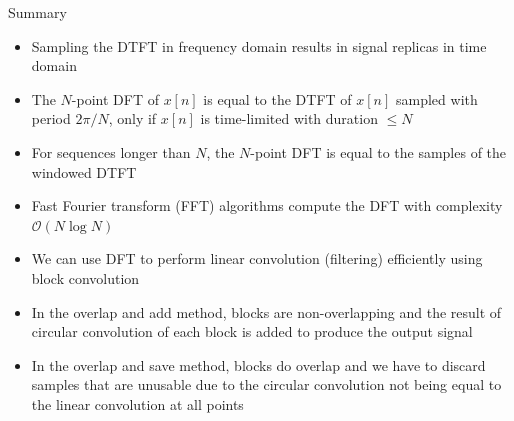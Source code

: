 \documentclass[10pt, handout]{beamer}
\begin{document}
%
\begin{frame}{Summary}
	\begin{itemize}
		\item Sampling the DTFT in frequency domain results in signal replicas in time domain
		\item The $N$-point DFT of $x[n]$ is equal to the DTFT of $x[n]$ sampled with period $2\pi/N$, only if $x[n]$ is time-limited with duration $\leq N$
		\item For sequences longer than $N$, the $N$-point DFT is equal to the samples of the windowed DTFT
		\item Fast Fourier transform (FFT) algorithms compute the DFT with complexity $\mathcal{O}(N\log N)$
		\item We can use DFT to perform linear convolution (filtering) efficiently using block convolution
		\item In the overlap and add method, blocks are non-overlapping and the result of circular convolution of each block is added to produce the output signal
		\item In the overlap and save method, blocks do overlap and we have to discard samples that are unusable due to the circular convolution not being equal to the linear convolution at all points
	\end{itemize}
\end{frame}
\end{document}

